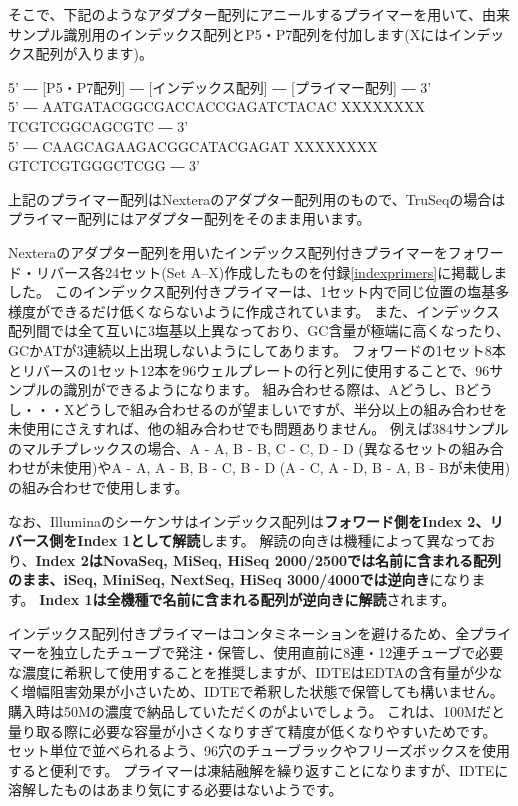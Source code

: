 \documentclass[titlepage,10pt,a4paper]{jsbook}
\newenvironment{pre}{\begin{leftbar}\raggedright\ttfamily\footnotesize\setlength{\baselineskip}{1.4em}}{\end{leftbar}\vspace{-1em}}
\begin{document}
そこで、下記のようなアダプター配列にアニールするプライマーを用いて、由来サンプル識別用のインデックス配列とP5・P7配列を付加します(Xにはインデックス配列が入ります)。

\begin{pre}
5' ― [P5・P7配列] ― [インデックス配列] ― [プライマー配列] ― 3'\\
5' ― AATGATACGGCGACCACCGAGATCTACAC XXXXXXXX TCGTCGGCAGCGTC ― 3'\\
5' ― CAAGCAGAAGACGGCATACGAGAT XXXXXXXX GTCTCGTGGGCTCGG ― 3'
\end{pre}

上記のプライマー配列はNexteraのアダプター配列用のもので、TruSeqの場合はプライマー配列にはアダプター配列をそのまま用います。

Nexteraのアダプター配列を用いたインデックス配列付きプライマーをフォワード・リバース各24セット(Set A--X)作成したものを付録\ref{indexprimers}に掲載しました。
このインデックス配列付きプライマーは、1セット内で同じ位置の塩基多様度ができるだけ低くならないように作成されています。
また、インデックス配列間では全て互いに3塩基以上異なっており、GC含量が極端に高くなったり、GCかATが3連続以上出現しないようにしてあります。
フォワードの1セット8本とリバースの1セット12本を96ウェルプレートの行と列に使用することで、96サンプルの識別ができるようになります。
組み合わせる際は、Aどうし、Bどうし・・・Xどうしで組み合わせるのが望ましいですが、半分以上の組み合わせを未使用にさえすれば、他の組み合わせでも問題ありません。
例えば384サンプルのマルチプレックスの場合、A - A, B - B, C - C, D - D (異なるセットの組み合わせが未使用)やA - A, A - B, B - C, B - D (A - C, A - D, B - A, B - Bが未使用)の組み合わせで使用します。

なお、Illuminaのシーケンサはインデックス配列は\textbf{フォワード側をIndex 2、リバース側をIndex 1として解読}します。
解読の向きは機種によって異なっており、\textbf{Index 2はNovaSeq, MiSeq, HiSeq 2000/2500では名前に含まれる配列のまま、iSeq, MiniSeq, NextSeq, HiSeq 3000/4000では逆向き}になります。
\textbf{Index 1は全機種で名前に含まれる配列が逆向きに解読}されます。

インデックス配列付きプライマーはコンタミネーションを避けるため、全プライマーを独立したチューブで発注・保管し、使用直前に8連・12連チューブで必要な濃度に希釈して使用することを推奨しますが、IDTEはEDTAの含有量が少なく増幅阻害効果が小さいため、IDTEで希釈した状態で保管しても構いません。
購入時は50{\textmu}Mの濃度で納品していただくのがよいでしょう。
これは、100{\textmu}Mだと量り取る際に必要な容量が小さくなりすぎて精度が低くなりやすいためです。
セット単位で並べられるよう、96穴のチューブラックやフリーズボックスを使用すると便利です。
プライマーは凍結融解を繰り返すことになりますが、IDTEに溶解したものはあまり気にする必要はないようです\citep{Speicher2017}。
\end{document}
